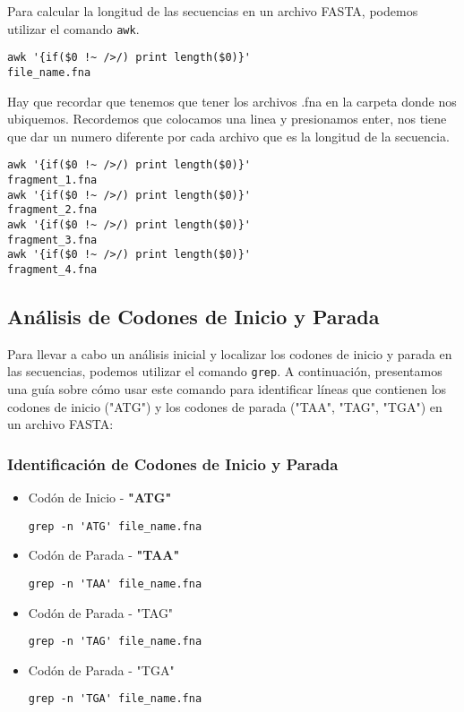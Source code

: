 Para calcular la longitud de las secuencias en un archivo FASTA, podemos utilizar el comando \texttt{awk}. 

\begin{verbatim}
awk '{if($0 !~ />/) print length($0)}' 
file_name.fna
\end{verbatim}

Hay que recordar que tenemos que tener los archivos .fna en la carpeta donde nos ubiquemos. Recordemos que colocamos una linea y presionamos enter, nos tiene que dar un numero diferente por cada archivo que es la longitud de la secuencia.
\begin{verbatim}
awk '{if($0 !~ />/) print length($0)}'
fragment_1.fna
awk '{if($0 !~ />/) print length($0)}' 
fragment_2.fna
awk '{if($0 !~ />/) print length($0)}' 
fragment_3.fna
awk '{if($0 !~ />/) print length($0)}'
fragment_4.fna
\end{verbatim}

\subsection*{Análisis de Codones de Inicio y Parada}

Para llevar a cabo un análisis inicial y localizar los codones de inicio y parada en las secuencias, podemos utilizar el comando \texttt{grep}. A continuación, presentamos una guía sobre cómo usar este comando para identificar líneas que contienen los codones de inicio ("ATG") y los codones de parada ("TAA", "TAG", "TGA") en un archivo FASTA:

\subsubsection*{Identificación de Codones de Inicio y Parada}

\begin{itemize}
\item Codón de Inicio - \textbf{"ATG"}  
\begin{verbatim}
grep -n 'ATG' file_name.fna
\end{verbatim}

\item Codón de Parada - \textbf{"TAA"}  
\begin{verbatim}
grep -n 'TAA' file_name.fna
\end{verbatim}

\item Codón de Parada - "TAG"  
\begin{verbatim}
grep -n 'TAG' file_name.fna
\end{verbatim}

\item Codón de Parada - "TGA"  
\begin{verbatim}
grep -n 'TGA' file_name.fna
\end{verbatim}
\end{itemize}

